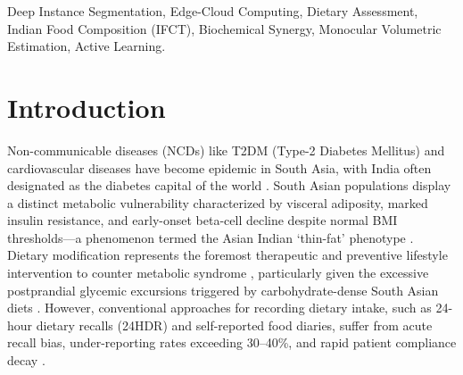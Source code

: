 \documentclass[conference]{IEEEtran}
\begin{document}
\begin{IEEEkeywords}
Deep Instance Segmentation, Edge-Cloud Computing, Dietary Assessment, Indian Food Composition (IFCT), Biochemical Synergy, Monocular Volumetric Estimation, Active Learning.
\end{IEEEkeywords}

\section{Introduction}
Non-communicable diseases (NCDs) like T2DM (Type-2 Diabetes Mellitus) and cardiovascular diseases have become epidemic in South Asia, with India often designated as the diabetes capital of the world \cite{who2023diabetes, gbd2019diabetes}. South Asian populations display a distinct metabolic vulnerability characterized by visceral adiposity, marked insulin resistance, and early-onset beta-cell decline despite normal BMI thresholds---a phenomenon termed the Asian Indian `thin-fat' phenotype \cite{singh2021lifestyle, yajnik2004phenotype}. Dietary modification represents the foremost therapeutic and preventive lifestyle intervention to counter metabolic syndrome \cite{singh2021lifestyle}, particularly given the excessive postprandial glycemic excursions triggered by carbohydrate-dense South Asian diets \cite{mohan2014carbohydrates}. However, conventional approaches for recording dietary intake, such as 24-hour dietary recalls (24HDR) and self-reported food diaries, suffer from acute recall bias, under-reporting rates exceeding 30--40\%, and rapid patient compliance decay \cite{subar2015addressing, zhu2010technology, patel2020mhealth}.
\end{document}
